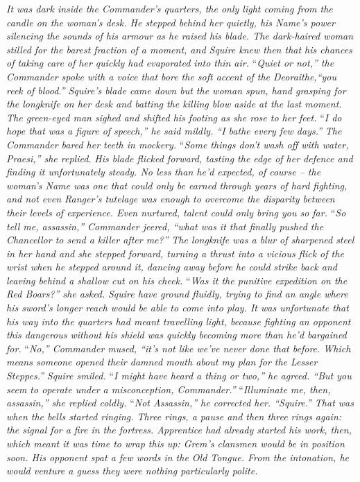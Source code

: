 \documentclass[12pt, openany]{book}
\begin{document}
\textit{It was dark inside the Commander’s quarters, the only light coming from the candle on the woman’s desk. He stepped behind her quietly, his Name’s power silencing the sounds of his armour as he raised his blade. The dark-haired woman stilled for the barest fraction of a moment, and Squire knew then that his chances of taking care of her quickly had evaporated into thin air.}
“\textit{Quiet or not,” the Commander spoke with a voice that bore the soft accent of the Deoraithe,“you reek of blood.”}
\textit{Squire’s blade came down but the woman spun, hand grasping for the longknife on her desk and batting the killing blow aside at the last moment. The green-eyed man sighed and shifted his footing as she rose to her feet.}
“\textit{I do hope that was a figure of speech,” he said mildly. “I bathe every few days.”}
\textit{The Commander bared her teeth in mockery.}
“\textit{Some things don’t wash off with water, Praesi,” she replied.}
\textit{His blade flicked forward, tasting the edge of her defence and finding it unfortunately steady. No less than he’d expected, of course – the woman’s Name was one that could only be earned through years of hard fighting, and not even Ranger’s tutelage was enough to overcome the disparity between their levels of experience. Even nurtured, talent could only bring you so far.}
“\textit{So tell me, assassin,” Commander jeered, “what was it that finally pushed the Chancellor to send a killer after me?”}
\textit{The longknife was a blur of sharpened steel in her hand and she stepped forward, turning a thrust into a vicious flick of the wrist when he stepped around it, dancing away before he could strike back and leaving behind a shallow cut on his cheek.}
“\textit{Was it the punitive expedition on the Red Boars?” she asked.}
\textit{Squire have ground fluidly, trying to find an angle where his sword’s longer reach would be able to come into play. It was unfortunate that his way into the quarters had meant travelling light, because fighting an opponent this dangerous without his shield was quickly becoming more than he’d bargained for.}
“\textit{No,” Commander mused, “it’s not like we’ve never done that before. Which means someone opened their damned mouth about my plan for the Lesser Steppes.”}
\textit{Squire smiled.}
“\textit{I might have heard a thing or two,” he agreed. “But you seem to operate under a misconception, Commander.”}
“\textit{Illuminate me, then, assassin,” she replied coldly.}
“\textit{Not Assassin,” he corrected her. “Squire.”}
\textit{That was when the bells started ringing. Three rings, a pause and then three rings again: the signal for a fire in the fortress. Apprentice had already started his work, then, which meant it was time to wrap this up: Grem’s clansmen would be in position soon. His opponent spat a few words in the Old Tongue. From the intonation, he would venture a guess they were nothing particularly polite.}
\end{document}
